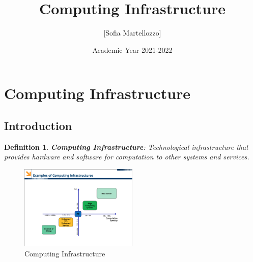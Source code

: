 \documentclass[10pt, oneside]{article}
\title{Computing Infrastructure}
\author{[Sofia Martellozzo]}
\date{Academic Year 2021-2022}
\newtheorem{defn}{Definition}
\begin{document}
\maketitle
\newpage
\tableofcontents

\vspace{.25in}
\newpage

\section{Computing Infrastructure}

\subsection{Introduction}
\begin{defn}
{\bf Computing Infrastructure}: Technological infrastructure that provides hardware and software for computation to other systems and services.
\end{defn}


\begin{figure}[H]
    \begin{center}
    \includegraphics[width=0.5\textwidth]{img/img1.png}
    \caption{Computing Infrastructure}
    \label{fig:computing infrastructure}
    \end{center}
\end{figure}
\end{document}
